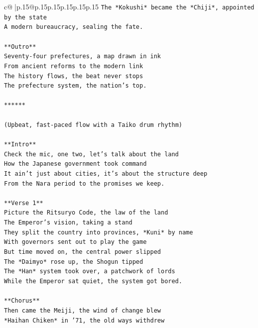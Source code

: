 \documentclass{article}
\begin{document}
{\begin{supertabular}{c@{$\;$}|p{.15\linewidth}@{}p{.15\linewidth}p{.15\linewidth}p{.15\linewidth}p{.15\linewidth}p{.15\linewidth}}
{{{\texttt{The *Kokushi* became the *Chiji*, appointed by the state} \\
\texttt{A modern bureaucracy, sealing the fate.} \\
\\ 
\texttt{**Outro**} \\
\texttt{Seventy{-}four prefectures, a map drawn in ink} \\
\texttt{From ancient reforms to the modern link} \\
\texttt{The history flows, the beat never stops} \\
\texttt{The prefecture system, the nation's top.} \\
\\ 
\texttt{******} \\
\\ 
\texttt{(Upbeat, fast{-}paced flow with a Taiko drum rhythm)} \\
\\ 
\texttt{**Intro**} \\
\texttt{Check the mic, one two, let's talk about the land} \\
\texttt{How the Japanese government took command} \\
\texttt{It ain't just about cities, it's about the structure deep} \\
\texttt{From the Nara period to the promises we keep.} \\
\\ 
\texttt{**Verse 1**} \\
\texttt{Picture the Ritsuryo Code, the law of the land} \\
\texttt{The Emperor's vision, taking a stand} \\
\texttt{They split the country into provinces, *Kuni* by name} \\
\texttt{With governors sent out to play the game} \\
\texttt{But time moved on, the central power slipped} \\
\texttt{The *Daimyo* rose up, the Shogun tipped} \\
\texttt{The *Han* system took over, a patchwork of lords} \\
\texttt{While the Emperor sat quiet, the system got bored.} \\
\\ 
\texttt{**Chorus**} \\
\texttt{Then came the Meiji, the wind of change blew} \\
\texttt{*Haihan Chiken* in '71, the old ways withdrew} \\
}}}
\end{supertabular}}
\end{document}
